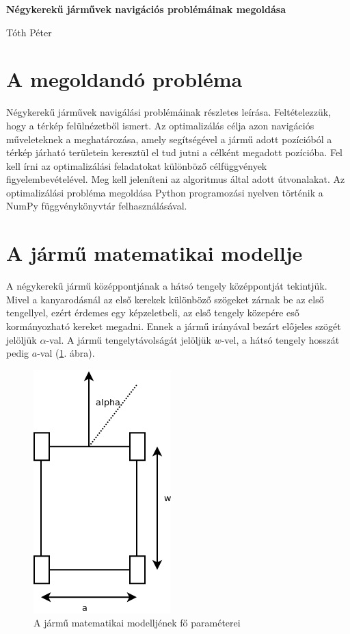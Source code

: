 \documentclass[a4paper]{paper}
\begin{document}
\begin{center}
    \Large
    \textbf{Négykerekű járművek navigációs problémáinak megoldása}
   
    \medskip   
   
    \Large
    Tóth Péter
\end{center}

\vskip 1cm

\pagestyle{empty}

\section{A megoldandó probléma}

Négykerekű járművek navigálási problémáinak részletes leírása. Feltételezzük, hogy a térkép felülnézetből ismert. Az optimalizálás célja azon navigációs műveleteknek a meghatározása, amely segítségével a jármű adott pozícióból a térkép járható területein keresztül el tud jutni a célként megadott pozícióba. Fel kell írni az optimalizálási feladatokat különböző célfüggvények figyelembevételével. Meg kell jeleníteni az algoritmus által adott útvonalakat. Az optimalizálási probléma megoldása Python programozási nyelven történik a NumPy függvénykönyvtár felhasználásával.

\section{A jármű matematikai modellje}

A négykerekű jármű középpontjának a hátsó tengely középpontját tekintjük. Mivel a kanyarodásnál az első kerekek különböző szögeket zárnak be az első tengellyel, ezért érdemes egy képzeletbeli, az első tengely közepére eső kormányozható kereket megadni. Ennek a jármű irányával bezárt előjeles szögét jelöljük $\alpha$-val. A jármű tengelytávolságát jelöljük $w$-vel, a hátsó tengely hosszát pedig $a$-val (\ref{fig:vehicle}. ábra).

\begin{figure}[h!]
\centering
\includegraphics[scale=0.8]{images/vehicle.png}
\caption{A jármű matematikai modelljének fő paraméterei}
\label{fig:vehicle}
\end{figure}
\end{document}
